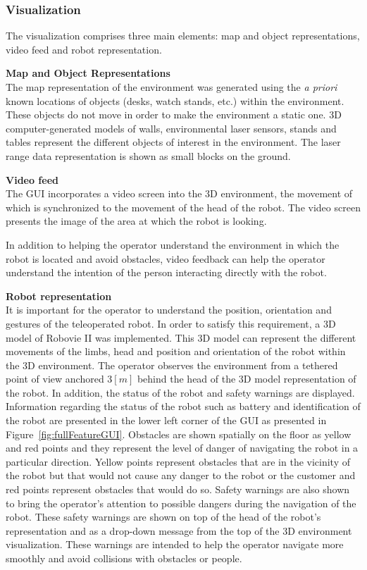 \documentclass[journal]{IEEEtran}
\begin{document}
\subsubsection{Visualization}
The visualization comprises three main elements: map and object representations, video feed and robot representation.

{\bf Map and Object Representations}\\
The map representation of the environment was generated using the \emph{a priori} known locations of objects (desks, watch stands, etc.) within the environment.
These objects do not move in order to make the environment a static one.
3D computer-generated models of walls, environmental laser sensors, stands and tables represent the different objects of interest in the environment.
The laser range data representation is shown as small blocks on the ground.

{\bf Video feed}\\
The GUI incorporates a video screen into the 3D environment, the movement of which is synchronized to the movement of the head of the robot.
The video screen presents the image of the area at which the robot is looking.

In addition to helping the operator understand the environment in which the robot is located and avoid obstacles, video feedback can help the operator understand the intention of the person interacting directly with the robot.

{\bf Robot representation}\\
It is important for the operator to understand the position, orientation and gestures of the teleoperated robot.
In order to satisfy this requirement, a 3D model of Robovie II was implemented.
This 3D model can represent the different movements of the limbs, head and position and orientation of the robot within the 3D environment.
The operator observes the environment from a tethered point of view anchored 3$[m]$ behind the head of the 3D model representation of the robot.
In addition, the status of the robot and safety warnings are displayed.
Information regarding the status of the robot such as battery and identification of the robot are presented in the lower left corner of the GUI as presented in Figure~\ref{fig:fullFeatureGUI}.
Obstacles are shown spatially on the floor as yellow and red points and they represent the level of danger of navigating the robot in a particular direction.
Yellow points represent obstacles that are in the vicinity of the robot but that would not cause any danger to the robot or the customer and red points represent obstacles that would do so.
Safety warnings are also shown to bring the operator's attention to possible dangers during the navigation of the robot.
These safety warnings are shown on top of the head of the robot's representation and as a drop-down message from the top of the 3D environment visualization.
These warnings are intended to help the operator navigate more smoothly and avoid collisions with obstacles or people.
\end{document}
